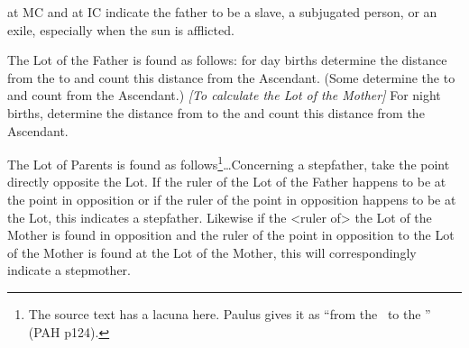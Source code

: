 \Saturn\xspace at MC and \Jupiter\xspace at IC indicate the
father to be a slave, a subjugated person, or an exile, especially when the sun is afflicted.

The Lot of the Father is found as follows: for day births determine the distance from the \Sun\xspace to \Saturn\xspace and count this distance from the Ascendant. (Some determine the \Sun\xspace to \Jupiter\xspace and count from the Ascendant.) \textsl{[To calculate the Lot of the Mother]} For night births, determine the distance from \Venus\xspace to the \Moon\xspace and count this distance from the Ascendant. 

The Lot of Parents is found as follows\footnote{The source text has a lacuna here. Paulus gives it as ``from the \Sun\, to the \Moon'' (PAH p124).}\ldots Concerning a stepfather, take the point directly opposite the Lot. If the ruler of the Lot of the Father happens to be at the point in opposition or if the ruler of the point in opposition happens to be at the Lot, this indicates a stepfather. Likewise if the <ruler of> the Lot of the Mother is found in opposition and the ruler of the point in opposition to the Lot of the Mother is found at the Lot of the Mother, this will
correspondingly indicate a stepmother.

\newpage